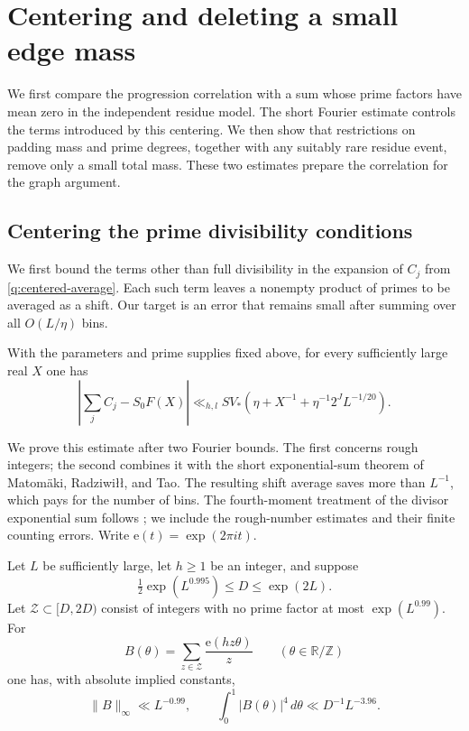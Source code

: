 \section{Centering and deleting a small edge mass}\label{q:analytic}

We first compare the progression correlation with a sum whose prime
factors have mean zero in the independent residue model.  The short
Fourier estimate controls the terms introduced by this centering.
We then show that restrictions on padding mass and prime degrees, together
with any suitably rare residue event, remove only a small total mass.
These two estimates prepare the correlation for the graph argument.

\subsection{Centering the prime divisibility conditions}

We first bound the terms other than full divisibility in the expansion
of $C_j$ from \eqref{q:centered-average}. Each such term leaves a
nonempty product of primes to be averaged as a shift. Our target is
an error that remains small after summing over all $O(L/\eta)$ bins.

\begin{lemma}\label{q:center}
With the parameters and prime supplies fixed above, for every sufficiently
large real $X$ one has
\begin{equation}\label{q:center-estimate}
 \left|\sum_j C_j-S_0F(X)\right|
 \ll_{h,l}SV_*\left(
   \eta+X^{-1}+\eta^{-1}2^JL^{-1/20}\right).
\end{equation}
\end{lemma}

We prove this estimate after two Fourier bounds. The first concerns
rough integers; the second combines it with the short exponential-sum
theorem of Matom\"aki, Radziwi\l\l, and Tao. The resulting shift
average saves more than $L^{-1}$, which pays for the number of bins.
The fourth-moment treatment of the divisor exponential sum follows
\cite[Appendix~C]{Pilatte26}; we include the rough-number estimates and
their finite counting errors. Write $\mathrm e(t)=\exp(2\pi i t)$.

\begin{lemma}\label{q:rough-fourier}
Let $L$ be sufficiently large, let $h\ge1$ be an integer, and suppose
\[
 \tfrac12\exp(L^{0.995})\le D\le\exp(2L).
\]
Let $\mathcal Z\subset[D,2D)$ consist of integers with no prime factor
at most $\exp(L^{0.99})$. For
\[
 B(\theta)=\sum_{z\in\mathcal Z}\frac{\mathrm e(hz\theta)}z
 \qquad(\theta\in\mathbb R/\mathbb Z)
\]
one has, with absolute implied constants,
\begin{equation}\label{q:rough-bounds}
 \|B\|_\infty\ll L^{-0.99},\qquad
 \int_0^1|B(\theta)|^4\,d\theta\ll D^{-1}L^{-3.96}.
\end{equation}
\end{lemma}

